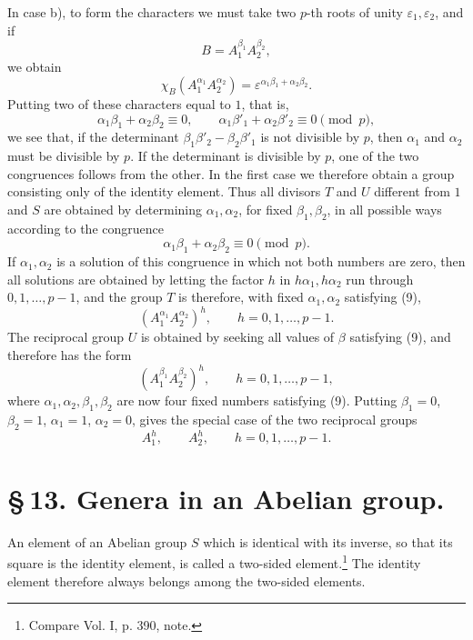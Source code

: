 \documentclass[11pt]{article}
\begin{document}
In case b), to form the characters we must take two $p$-th roots of unity $\varepsilon_1,\varepsilon_2$, and if
\[
B=A_1^{\beta_1}A_2^{\beta_2},
\]
we obtain
\[
\chi_B(A_1^{\alpha_1}A_2^{\alpha_2})=
\varepsilon^{\alpha_1\beta_1+\alpha_2\beta_2}.
\]
Putting two of these characters equal to $1$, that is,
\[
\alpha_1\beta_1+\alpha_2\beta_2\equiv0,
\qquad
\alpha_1\beta'_1+\alpha_2\beta'_2\equiv0 \pmod p,
\]
we see that, if the determinant $\beta_1\beta'_2-\beta_2\beta'_1$ is not divisible by $p$, then $\alpha_1$ and $\alpha_2$ must be divisible by $p$. If the determinant is divisible by $p$, one of the two congruences follows from the other. In the first case we therefore obtain a group consisting only of the identity element. Thus all divisors $T$ and $U$ different from $1$ and $S$ are obtained by determining $\alpha_1,
\alpha_2$, for fixed $\beta_1,
\beta_2$, in all possible ways according to the congruence
\begin{equation}
\alpha_1\beta_1+\alpha_2\beta_2\equiv0\pmod p.
\tag{9}
\end{equation}
If $\alpha_1,
\alpha_2$ is a solution of this congruence in which not both numbers are zero, then all solutions are obtained by letting the factor $h$ in $h\alpha_1,h\alpha_2$ run through $0,1,
\ldots,p-1$, and the group $T$ is therefore, with fixed $\alpha_1,
\alpha_2$ satisfying (9),
\[
(A_1^{\alpha_1}A_2^{\alpha_2})^h,
\qquad h=0,1,\ldots,p-1.
\]
The reciprocal group $U$ is obtained by seeking all values of $\beta$ satisfying (9), and therefore has the form
\[
(A_1^{\beta_1}A_2^{\beta_2})^h,
\qquad h=0,1,\ldots,p-1,
\]
where $\alpha_1,
\alpha_2,
\beta_1,
\beta_2$ are now four fixed numbers satisfying (9). Putting $\beta_1=0$, $\beta_2=1$, $\alpha_1=1$, $\alpha_2=0$, gives the special case of the two reciprocal groups
\[
A_1^h,
\qquad A_2^h,
\qquad h=0,1,\ldots,p-1.
\]

\section*{\S\,13. Genera in an Abelian group.}

An element of an Abelian group $S$ which is identical with its inverse, so that its square is the identity element, is called a two-sided element.\footnote{Compare Vol. I, p. 390, note.} The identity element therefore always belongs among the two-sided elements.
\end{document}
